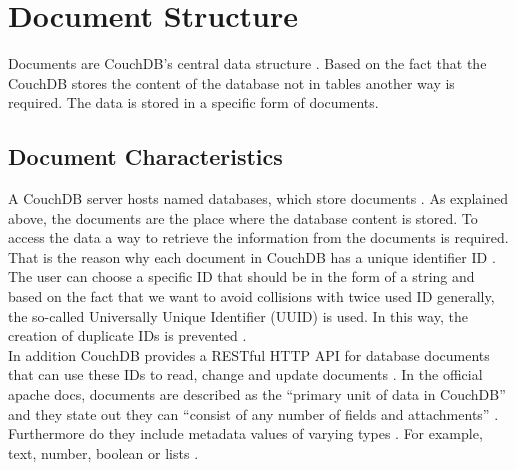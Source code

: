 \section{Document Structure}

Documents are CouchDB’s central data structure \parencite{Tutorialspoint, CouchDB.Guide}. 
Based on the fact that the CouchDB stores the content of the database not in tables another way is required. The data is stored in a specific form of documents.


\subsection{Document Characteristics}
A CouchDB server hosts named databases, which store documents \parencite{apache.docs.2.0}. As explained above, the documents are the place where the database content is stored. To access the data a way to retrieve the information from the documents is required. That is the reason why each document in CouchDB has a unique identifier ID \parencite{Brown.2012, Tutorialspoint}. The user can choose a specific ID that should be in the form of a string and based on the fact that we want to avoid collisions with twice used ID generally, the so-called Universally Unique Identifier (UUID) is used. In this way, the creation of duplicate IDs is prevented \parencite{Tutorialspoint}. \\
In addition CouchDB provides a RESTful HTTP API for database documents that can use these IDs to read, change and update documents \parencite{apache.docs.2.0}.
In the official apache docs, documents are described as the ``primary unit of data in CouchDB''  and they state out they can ``consist of any number of fields and attachments'' \parencite{apache.docs.2.0}. 
Furthermore do they include metadata values of varying types \parencite{apache.docs.2.0}. For example, text, number, boolean or lists \parencite{apache.docs.2.0}.
\newline


